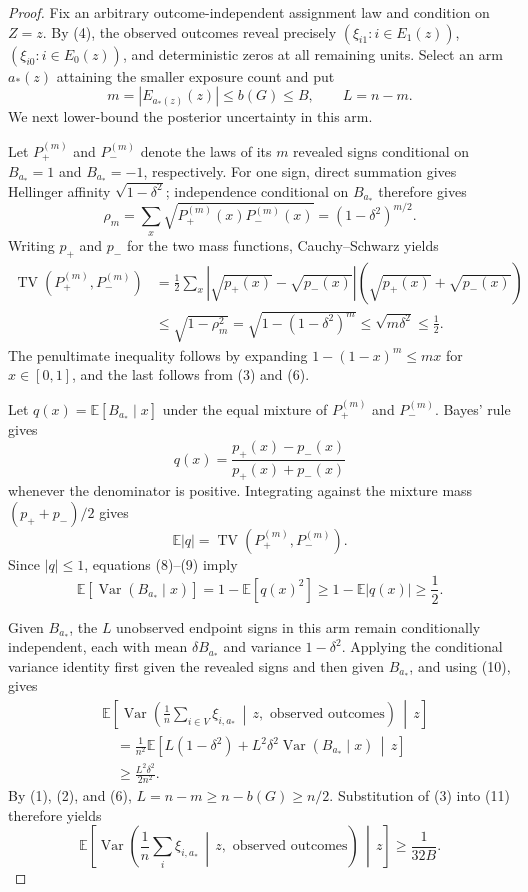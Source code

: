 \documentclass{article}
\begin{document}
\begin{proof}
Fix an arbitrary outcome-independent assignment law and condition on \(Z=z\).  By (4), the observed outcomes reveal precisely \((\xi_{i1}:i\in E_1(z))\), \((\xi_{i0}:i\in E_0(z))\), and deterministic zeros at all remaining units.  Select an arm \(a_*(z)\) attaining the smaller exposure count and put
\[
m=|E_{a_*(z)}(z)|\le b(G)\le B,
\qquad L=n-m. \tag{6}
\]
We next lower-bound the posterior uncertainty in this arm.

Let \(P_+^{(m)}\) and \(P_-^{(m)}\) denote the laws of its \(m\) revealed signs conditional on \(B_{a_*}=1\) and \(B_{a_*}=-1\), respectively.  For one sign, direct summation gives Hellinger affinity \(\sqrt{1-\delta^2}\); independence conditional on \(B_{a_*}\) therefore gives
\[
\rho_m=\sum_x\sqrt{P_+^{(m)}(x)P_-^{(m)}(x)}
=(1-\delta^2)^{m/2}. \tag{7}
\]
Writing \(p_+\) and \(p_-\) for the two mass functions, Cauchy--Schwarz yields
\[
\begin{aligned}
\operatorname{TV}(P_+^{(m)},P_-^{(m)})
&=\frac12\sum_x|\sqrt{p_+(x)}-\sqrt{p_-(x)}|
                    (\sqrt{p_+(x)}+\sqrt{p_-(x)})\\
&\le \sqrt{1-\rho_m^2}
=\sqrt{1-(1-\delta^2)^m}
\le \sqrt{m\delta^2}
\le\frac12. \tag{8}
\end{aligned}
\]
The penultimate inequality follows by expanding \(1-(1-x)^m\le mx\) for \(x\in[0,1]\), and the last follows from (3) and (6).

Let \(q(x)=\mathbb E[B_{a_*}\mid x]\) under the equal mixture of \(P_+^{(m)}\) and \(P_-^{(m)}\).  Bayes' rule gives
\[
q(x)=\frac{p_+(x)-p_-(x)}{p_+(x)+p_-(x)}
\]
whenever the denominator is positive.  Integrating against the mixture mass \((p_++p_-)/2\) gives
\[
\mathbb E|q|=\operatorname{TV}(P_+^{(m)},P_-^{(m)}). \tag{9}
\]
Since \(|q|\le1\), equations (8)--(9) imply
\[
\mathbb E\!\left[\operatorname{Var}(B_{a_*}\mid x)\right]
=1-\mathbb E[q(x)^2]
\ge1-\mathbb E|q(x)|
\ge\frac12. \tag{10}
\]

Given \(B_{a_*}\), the \(L\) unobserved endpoint signs in this arm remain conditionally independent, each with mean \(\delta B_{a_*}\) and variance \(1-\delta^2\).  Applying the conditional variance identity first given the revealed signs and then given \(B_{a_*}\), and using (10), gives
\[
\begin{aligned}
&\mathbb E\!\left[
\operatorname{Var}\!\left(
\frac1n\sum_{i\in V}\xi_{i,a_*}\,\middle|\,
z,\text{ observed outcomes}
\right)\,\middle|\,z\right]\\
&\quad=\frac1{n^2}\mathbb E\!\left[
L(1-\delta^2)+L^2\delta^2
\operatorname{Var}(B_{a_*}\mid x)\,\middle|\,z\right]\\
&\quad\ge\frac{L^2\delta^2}{2n^2}. \tag{11}
\end{aligned}
\]
By (1), (2), and (6), \(L=n-m\ge n-b(G)\ge n/2\).  Substitution of (3) into (11) therefore yields
\[
\mathbb E\!\left[
\operatorname{Var}\!\left(
\frac1n\sum_i\xi_{i,a_*}\,\middle|\,
z,\text{ observed outcomes}
\right)\,\middle|\,z\right]
\ge \frac1{32B}. \tag{12}
\]


\end{proof}
\end{document}
